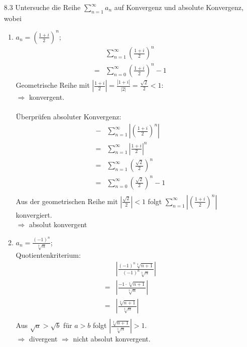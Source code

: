 \documentclass{HM}
\begin{document}
\begin{enumerate}
\item[8.3] Untersuche die Reihe $\sum\limits_{n=1}^\infty a_n$ auf Konvergenz und absolute Konvergenz, wobei\\
\begin{enumerate}

\item $a_n=\left(\frac{1+i}{2}\right)^n$;
\begin{align*}
 	&\sum\limits_{n=1}^\infty\left(\frac{1+i}{2}\right)^n\\
	=&\sum\limits_{n=0}^\infty\left(\frac{1+i}{2}\right)^n-1
\end{align*}
Geometrische Reihe mit $|\frac{1+i}{2}| = \frac{|1+i|}{|2|} = \frac{\sqrt{2}}{2} < 1$:\\
$\Rightarrow$ konvergent.\\\\
Überprüfen absoluter Konvergenz:\\
\begin{align*}-
	&\sum\limits_{n=1}^\infty\left|\left(\frac{1+i}{2}\right)^n\right|\\
	=&\sum\limits_{n=1}^\infty\left|\frac{1+i}{2}\right|^n\\
	=&\sum\limits_{n=1}^\infty\left(\frac{\sqrt{2}}{2}\right)^n\\
	=&\sum\limits_{n=0}^\infty\left(\frac{\sqrt{2}}{2}\right)^n-1\\
\end{align*}
Aus der geometrischen Reihe mit $|\frac{\sqrt{2}}{2}| < 1$ folgt $\sum\limits_{n=1}^\infty\left|\left(\frac{1+i}{2}\right)^n\right|$ konvergiert.\\
$\Rightarrow$ absolut konvergent\\

\item $a_n=\frac{(-1)^n}{\sqrt[3]{n}}$;\\
Quotientenkriterium:
\begin{align*}
	&\left|\frac{(-1)^n\sqrt[3]{n+1}}{(-1)^n\sqrt[3]{n}}\right|\\
	=&\left|\frac{-1\cdot\sqrt[3]{n+1}}{\sqrt[3]{n}}\right|\\
	=&\left|\frac{\sqrt[3]{n+1}}{\sqrt[3]{n}}\right|\\
\end{align*}
Aus $\sqrt{a}>\sqrt{b}$ für $a>b$ folgt $\left|\frac{\sqrt[3]{n+1}}{\sqrt[3]{n}}\right|>1$.\\
$\Rightarrow$ divergent $\Rightarrow$ nicht absolut konvergent.\\


\end{enumerate}
\end{enumerate}
\end{document}

